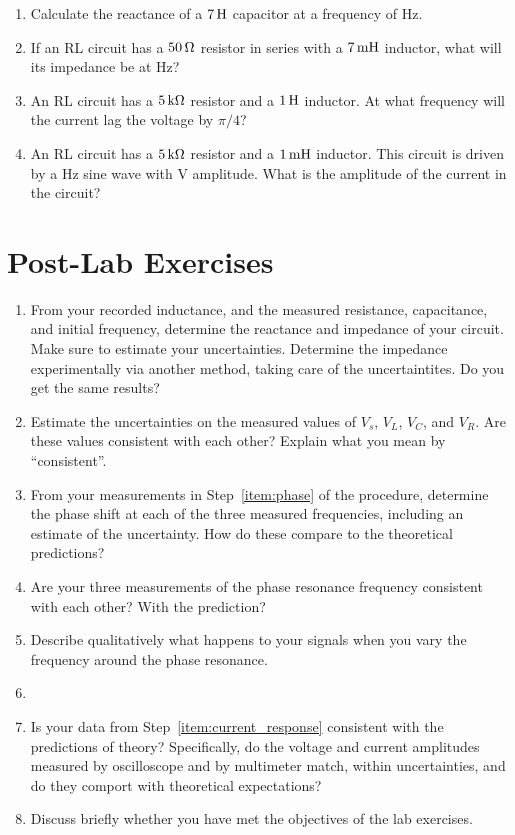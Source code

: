 \documentclass[12pt]{article}
\begin{document}
\begin{enumerate}
\item Calculate the reactance of a $\unit[7]{H}$ capacitor at a
  frequency of \unit[250]{Hz}.
\item If an RL circuit has a $\unit[50]{\Omega}$ resistor in series
  with a $\unit[7]{m H}$ inductor, what will its impedance be at
  \unit[500]{Hz}?
\item An RL circuit has a $\unit[5]{k\Omega}$ resistor and a
  $\unit[1]{H}$ inductor.  At what frequency will the current
  lag the voltage by $\pi/4$?
\item An RL circuit has a $\unit[5]{k\Omega}$ resistor and a
  $\unit[1]{m H}$ inductor.  This circuit is driven by a
  \unit[100]{Hz} sine wave with \unit[1]{V} amplitude.  What is the
  amplitude of the current in the circuit?
\end{enumerate}

\newpage

\section*{Post-Lab Exercises}

\begin{enumerate}
\item From your recorded inductance, and the measured resistance,
  capacitance, and initial frequency, determine the reactance and
  impedance of your circuit.  Make sure to estimate your
  uncertainties.  Determine the impedance experimentally via another
  method, taking care of the uncertaintites.%
  Do you get the same results?
\item Estimate the uncertainties on the measured values of $V_s$,
  $V_L$, $V_C$, and $V_R$.  Are these values consistent with each
  other?  Explain what you mean by ``consistent''.
\item From your measurements in Step~\ref{item:phase} of the
  procedure, determine the phase shift at each of the three measured
  frequencies, including an estimate of the uncertainty.  How do these
  compare to the theoretical predictions? 
\item Are your three measurements of the phase resonance frequency
  consistent with each other?  With the prediction?  
\item Describe qualitatively what happens to your signals when you
  vary the frequency around the phase resonance.
\item {}
\item Is your data from Step~\ref{item:current_response} consistent with the
  predictions of theory?  Specifically, do the voltage and current
  amplitudes measured by oscilloscope and by multimeter match, within
  uncertainties, and do they comport with theoretical expectations?
\item Discuss briefly whether you have met the objectives of the lab
  exercises.
\end{enumerate}
\end{document}
